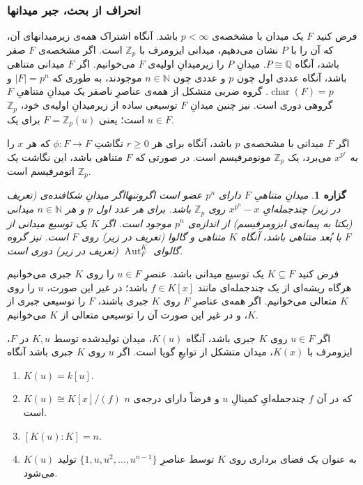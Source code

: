 \documentclass[12pt,a4paper]{report}
\theoremstyle{colorhead}
\newtheorem{prop}[thm]{گزاره}
\DeclareMathOperator{\chara}{char}
\DeclareMathOperator{\Aut}{Aut}
\begin{document}
\subsubsection{انحراف از بحث، جبر میدانها}
فرض کنید
$F$
یک میدان با مشخصه‌ی 
$p<\infty$
باشد. آنگاه اشتراک همه‌ی زیرمیدانهای آن، 
که آن را 
با
$P$
نشان می‌دهیم،
میدانی ایزومرف با
$\mathbb{Z}_p$
است. اگر
مشخصه‌ی
$F$
صفر باشد، آنگاه
$P\cong \mathbb{Q}$.
میدانِ
$P$
را زیرمیدانِ اولیه‌ی
$F$
می‌خوانیم. 
اگر
$F$
میدانی متناهی باشد، آنگاه
عددی اول چون
$p$
و عددی چون
$n\in \mathbb{N}$
موجودند، به طوری که
$|F|=p^n$ 
و 
$\chara(F)=p$.
گروه ضربی متشکل از همه‌ی عناصرِ
ناصفر یک میدانِ متناهیِ
$F$
گروهی دوری است. نیز چنین میدانِ
$F$
توسیعی ساده از زیرمیدانِ
اولیه‌ی خود،
$\mathbb{Z}_p$
است؛ یعنی
$F=\mathbb{Z}_p(u)$
برای یک
$u\in F$.
\par 
اگر
$F$
میدانی با مشخصه‌ی
$p$
باشد، آنگاه 
برای هر
$r\geq 0$
نگاشتِ
$\phi:F\to F$
که هر 
$x$
را به 
$x^{p^r}$
می‌برد، یک
$\mathbb{Z}_p$
مونومرفیسم است. در صورتی که
$F$
متناهی باشد، این نگاشت یک
$\mathbb{Z}_p$
اتومرفیسم است. 
\begin{prop}
میدانِ
متناهیِ
$F$
دارای 
$p^n$
عضو است اگروتنهااگر میدانِ شکافنده‌ی 
(تعریف در زیر)
چندجمله‌ایِ
$x^{p^n}-x$
روی
$\mathbb{Z}_p$
باشد. برای هر عدد اول
$p$
و هر
$n\in \mathbb{N}$
میدانی (یکتا به پیمانه‌ی ایزومرفیسم) از اندازه‌ی
$p^n$
موجود است.
اگر
$K$
یک توسیع میدانی از
$F$
با بُعد متناهی باشد، آنگاه
$K$
متناهی و گالوا (تعریف در زیر) روی
$F$
است. نیز گروه گالوای
 $\Aut_F^K$
 (تعریف در زیر)
دوری است. 
\end{prop}
فرض کنید
$K\subseteq F$
یک توسیع میدانی باشد. عنصرِ
$u\in F$
را روی
$K$
جبری می‌خوانیم هرگاه ریشه‌ای از یک چندجمله‌ای مانند
$f\in K[x]$
باشد؛ در غیر این صورت،
$u$
را روی
$K$
متعالی می‌خوانیم. اگر
همه‌ی عناصرِ
$F$
روی
$K$
جبری باشند، 
$F$
را توسیعی جبری از
$K$،
و در غیر این صورت آن را توسیعی متعالی از
$K$
می‌خوانیم. 
\par 
اگر
$u\in F$
روی
$K$
جبری باشد، آنگاه
$K(u)$،
میدان تولیدشده توسط
$K,u$
در
$F$،
ایزومرف با
$K(x)$،
میدان متشکل از توابعِ گویا است. اگر
$u$
روی
$K$
جبری باشد آنگاه
\begin{enumerate}
\item 
$K(u)=k[u]$.
\item 
$K(u)\cong K[x]/(f)$
که در آن
$f$
چندجمله‌ایِ 
کمینالِ
$u$
و فرضاً دارای  درجه‌ی
$n$
است.
\item 
$[K(u):K]=n$.
\item 
$K(u)$
به عنوان یک فضای برداری روی
$K$
توسط عناصرِ
$\{1,u,u^2,\ldots,u^{n-1}\}$
تولید می‌شود. 
\end{enumerate}
\end{document}
